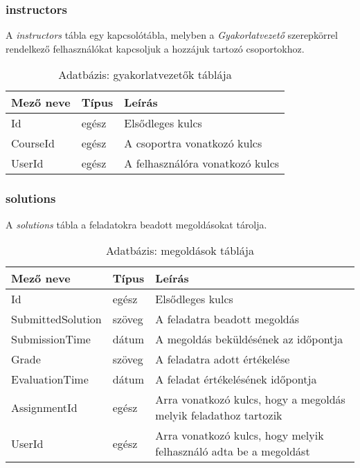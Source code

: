 \subsubsection{instructors}
A \emph{instructors} tábla egy kapcsolótábla, melyben a \emph{Gyakorlatvezető} szerepkörrel rendelkező felhasználókat kapcsoljuk a hozzájuk tartozó csoportokhoz. 
\begin{table}[H]
	\centering
	\begin{tabular}{ | m{} | m{} | m{} | }
		\hline
		\textbf{Mező neve} & \textbf{Típus} & \textbf{Leírás} \\
		\hline \hline
		Id & egész & Elsődleges kulcs \\
		\hline
		CourseId & egész & A csoportra vonatkozó kulcs \\
		\hline
		UserId & egész & A felhasználóra vonatkozó kulcs \\
		\hline
	\end{tabular}
	\caption{Adatbázis: gyakorlatvezetők táblája}
	\label{tab:db-instructors}
\end{table}
\subsubsection{solutions}
A \emph{solutions} tábla a feladatokra beadott megoldásokat tárolja.
\begin{table}[H]
	\centering
	\begin{tabular}{ | m{} | m{} | m{} | }
		\hline
		\textbf{Mező neve} & \textbf{Típus} & \textbf{Leírás} \\
		\hline \hline
		Id & egész & Elsődleges kulcs \\
		\hline
		SubmittedSolution & szöveg & A feladatra beadott megoldás \\
		\hline
		SubmissionTime & dátum & A megoldás beküldésének az időpontja \\
		\hline
		Grade & szöveg & A feladatra adott értékelése \\
		\hline
		EvaluationTime & dátum & A feladat értékelésének időpontja \\
		\hline
		AssignmentId & egész & Arra vonatkozó kulcs, hogy a megoldás melyik feladathoz tartozik\\
		\hline
		UserId & egész & Arra vonatkozó kulcs, hogy melyik felhasználó adta be a megoldást\\
		\hline
	\end{tabular}
	\caption{Adatbázis: megoldások táblája}
	\label{tab:db-solutions}
\end{table}
